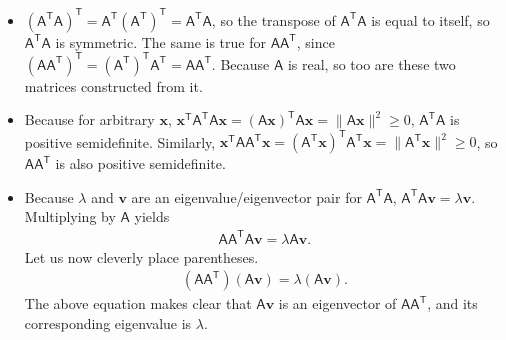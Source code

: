 \documentclass{integrated_core_problems}
\begin{document}
\begin{answerkey}
\begin{solution}
\begin{itemize}
    \item[a)] $(\mathsf{A}^\mathsf{T}\mathsf{A})^\mathsf{T} = \mathsf{A}^\mathsf{T}(\mathsf{A}^\mathsf{T})^\mathsf{T} = \mathsf{A}^\mathsf{T}\mathsf{A}$,
    so the transpose of $\mathsf{A}^\mathsf{T}\mathsf{A}$ is equal to itself, so $\mathsf{A}^\mathsf{T}\mathsf{A}$ is symmetric. The same is true for $\mathsf{A}\mathsf{A}^\mathsf{T}$, since $(\mathsf{A}\mathsf{A}^\mathsf{T})^\mathsf{T} = (\mathsf{A}^\mathsf{T})^\mathsf{T}\mathsf{A}^\mathsf{T} = \mathsf{A}\mathsf{A}^\mathsf{T}$. Because $\mathsf{A}$ is real, so too are these two matrices constructed from it.
    \item[b)] Because for arbitrary $\mathbf{x}$, $\mathbf{x}^\mathsf{T}\mathsf{A}^\mathsf{T}\mathsf{A}\mathbf{x} = (\mathsf{A}\mathbf{x})^\mathsf{T}\mathsf{A}\mathbf{x} = \lVert \mathsf{A}\mathbf{x} \rVert^2 \ge 0$, $\mathsf{A}^\mathsf{T}\mathsf{A}$ is positive semidefinite. Similarly, $\mathbf{x}^\mathsf{T}\mathsf{A}\mathsf{A}^\mathsf{T}\mathbf{x} = (\mathsf{A}^\mathsf{T}\mathbf{x})^\mathsf{T}\mathsf{A}^\mathsf{T}\mathbf{x} = \lVert \mathsf{A}^\mathsf{T}\mathbf{x} \rVert^2 \ge 0$, so $\mathsf{A}\mathsf{A}^\mathsf{T}$ is also positive semidefinite.
    \item[c)] Because $\lambda$ and $\mathbf{v}$ are an eigenvalue/eigenvector pair for $\mathsf{A}^\mathsf{T}\mathsf{A}$, $\mathsf{A}^\mathsf{T}\mathsf{A} \mathbf{v} = \lambda \mathbf{v}$. Multiplying by $\mathsf{A}$ yields
    \begin{align}
        \mathsf{A}\mathsf{A}^\mathsf{T}\mathsf{A} \mathbf{v} = \lambda \mathsf{A}\mathbf{v}.
    \end{align}
    Let us now cleverly place parentheses.
    \begin{align}
        (\mathsf{A}\mathsf{A}^\mathsf{T})(\mathsf{A} \mathbf{v}) = \lambda (\mathsf{A}\mathbf{v}).
    \end{align}
    The above equation makes clear that $\mathsf{A}\mathbf{v}$ is an eigenvector of $\mathsf{A}\mathsf{A}^\mathsf{T}$, and its corresponding eigenvalue is $\lambda$.
\end{itemize}

\end{solution}
\end{answerkey}
\end{document}
